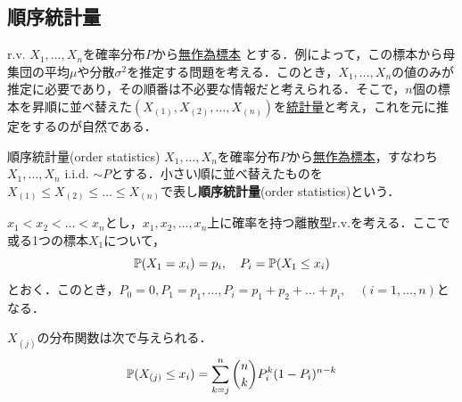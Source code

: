 \documentclass[main.tex]{subfiles}
\begin{document}
\subsection{順序統計量}
r.v. $X_1, \dots, X_n$を確率分布$P$から\hyperref[def:random_sample]{無作為標本} とする．例によって，この標本から母集団の平均$\mu$や分散$\sigma^2$を推定する問題を考える．このとき，$X_1, \dots, X_n$の値のみが推定に必要であり，その順番は不必要な情報だと考えられる．そこで，$n$個の標本を昇順に並べ替えた$(X_{(1)}, X_{(2)}, \dots, X_{(n)})$を\hyperlink{def:statistic}{統計量}と考え，これを元に推定をするのが自然である．

\begin{mydefinition}{順序統計量(order statistics)}
\label{def:order_statistics} %
$X_1, \dots, X_n$を確率分布$P$から\hyperref[def:random_sample]{無作為標本}，すなわち$X_1, \dots, X_n$ i.i.d. $\sim P$とする．小さい順に並べ替えたものを$X_{(1)} \leq X_{(2)} \leq \dots \leq X_{(n)}$で表し\textbf{順序統計量}(order statistics)という．
\end{mydefinition}

$x_1 < x_2 < \dots < x_n$とし，$x_1 , x_2, \dots , x_n$上に確率を持つ離散型r.v.を考える．ここで或る1つの標本$X_1$について，
\begin{equation}
  \mathbb{P}(X_1 = x_i) = p_i, \quad P_i = \mathbb{P}(X_1 \leq x_i)
  \label{eq:discrete_rv}
\end{equation}
とおく．このとき，$P_0 =0, P_1 =p_1, \dots, P_i = p_1 + p_2 + \dots + p_i  , \quad (i=1, \dots, n)$となる．

\begin{myproposition}{}
\label{prop:order_statistics_discrete} %
$X_{(j)}$の分布関数は次で与えられる．
\begin{equation}
  \mathbb{P}(X_{(j)} \leq x_i) = \sum_{k=j}^{n} \binom{n}{k} P_i^k (1-P_i)^{n-k}
\end{equation}

\end{myproposition}
\end{document}
